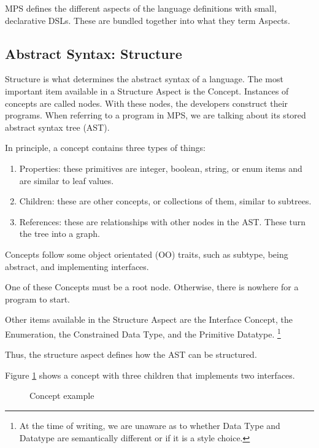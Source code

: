 MPS defines the different aspects of the language definitions with small, declarative DSLs.
These are bundled together into what they term Aspects.

\subsection{Abstract Syntax: Structure}
Structure is what determines the abstract syntax of a language.
The most important item available in a Structure Aspect is the Concept.
Instances of concepts are called nodes.
With these nodes, the developers construct their programs.
When referring to a program in MPS, we are talking about its stored abstract syntax tree (AST).

In principle, a concept contains three types of things:
\begin{enumerate}
    \item Properties: these primitives are integer, boolean, string, or enum items and are similar to leaf values.
    \item Children: these are other concepts, or collections of them, similar to subtrees.
    \item References: these are relationships with other nodes in the AST. These turn the tree into a graph.
\end{enumerate}

Concepts follow some object orientated (OO) traits, such as subtype, being abstract, and implementing interfaces.

One of these Concepts must be a root node. 
Otherwise, there is nowhere for a program to start.

Other items available in the Structure Aspect are the Interface Concept, the Enumeration, the Constrained Data Type, and the Primitive Datatype.
\footnote{At the time of writing, we are unaware as to whether Data Type and Datatype are semantically different or if it is a style choice.}

Thus, the structure aspect defines how the AST can be structured.

Figure \ref{fig:concept_example} shows a concept with three children that implements two interfaces.

\begin{figure}[h]
    \centering
    \caption{Concept example}
    \label{fig:concept_example}
\end{figure}
 

